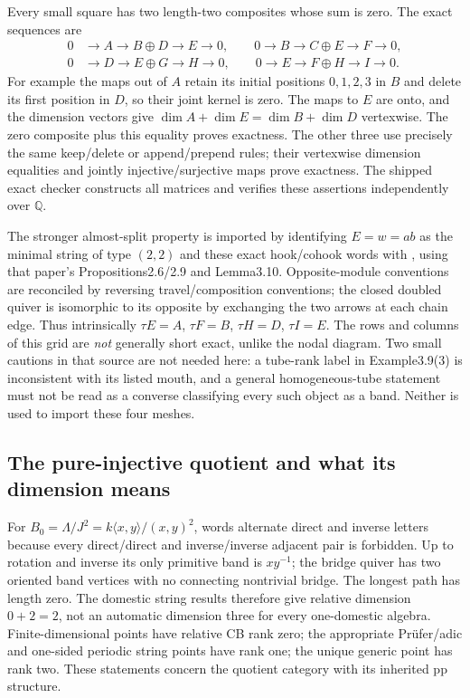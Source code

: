 \documentclass[11pt]{article}
\theoremstyle{definition}\newtheorem{definition}[theorem]{Definition}
\theoremstyle{remark}\newtheorem{remark}[theorem]{Remark}
\begin{document}
Every small square has two length-two composites whose sum is zero. The exact sequences are
\[
\begin{split}
0&\to A\to B\oplus D\to E\to0,\qquad
0\to B\to C\oplus E\to F\to0,\\
0&\to D\to E\oplus G\to H\to0,\qquad
0\to E\to F\oplus H\to I\to0.
\end{split}
\]
For example the maps out of $A$ retain its initial positions $0,1,2,3$ in $B$ and delete its first position in $D$, so their joint kernel is zero. The maps to $E$ are onto, and the dimension vectors give $\dim A+\dim E=\dim B+\dim D$ vertexwise. The zero composite plus this equality proves exactness. The other three use precisely the same keep/delete or append/prepend rules; their vertexwise dimension equalities and jointly injective/surjective maps prove exactness. The shipped exact checker constructs all matrices and verifies these assertions independently over $\mathbb Q$.

The stronger almost-split property is imported by identifying $E=w=ab$ as the minimal string of type $(2,2)$ and these exact hook/cohook words with \cite[Proposition3.12]{HuangLinSu}, using that paper's Propositions2.6/2.9 and Lemma3.10. Opposite-module conventions are reconciled by reversing travel/composition conventions; the closed doubled quiver is isomorphic to its opposite by exchanging the two arrows at each chain edge. Thus intrinsically $\tau E=A$, $\tau F=B$, $\tau H=D$, $\tau I=E$. The rows and columns of this grid are \emph{not} generally short exact, unlike the nodal diagram. Two small cautions in that source are not needed here: a tube-rank label in Example3.9(3) is inconsistent with its listed mouth, and a general homogeneous-tube statement must not be read as a converse classifying every such object as a band. Neither is used to import these four meshes.

\subsection{The pure-injective quotient and what its dimension means}
For $B_0=\Lambda/J^2=k\langle x,y\rangle/(x,y)^2$, words alternate direct and inverse letters because every direct/direct and inverse/inverse adjacent pair is forbidden. Up to rotation and inverse its only primitive band is $xy^{-1}$; the bridge quiver has two oriented band vertices with no connecting nontrivial bridge. The longest path has length zero. The domestic string results \cite{PuninskiPrest,LakingPrestPuninski} therefore give relative dimension $0+2=2$, not an automatic dimension three for every one-domestic algebra. Finite-dimensional points have relative CB rank zero; the appropriate Prüfer/adic and one-sided periodic string points have rank one; the unique generic point has rank two. These statements concern the quotient category with its inherited pp structure.
\end{document}
